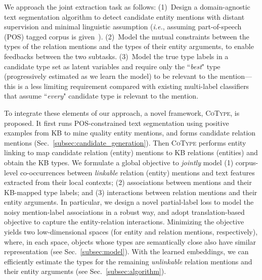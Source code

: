 \documentclass[letterpaper]{sig-alternate-2013}
\def\ie{{\sl i.e.}}
\begin{document}
We approach the joint extraction task as follows: (1)~Design a domain-agnostic text segmentation algorithm to detect candidate entity mentions with distant supervision and minimal linguistic assumption (\ie, assuming part-of-speech (POS) tagged corpus is given~\cite{hovy2015mining}). 
(2)~Model the mutual constraints between the types of the relation mentions and the types of their entity arguments, to enable feedbacks between the two subtasks. (3)~Model the true type labels in a candidate type set as latent variables and require only the ``\textit{best}" type (progressively estimated as we learn the model) to be relevant to the mention---this is a less limiting requirement compared with existing multi-label classifiers that assume ``\textit{every}" candidate type is relevant to the mention.



To integrate these elements of our approach, a novel framework, \textsc{CoType}, is proposed. It first runs POS-constrained text segmentation using positive examples from KB to mine quality entity mentions, and forms candidate relation mentions (Sec.~\ref{subsec:candidate_generation}). Then \textsc{CoType} performs entity linking to map candidate relation (entity) mentions to KB relations (entities) and obtain the KB types. We formulate a global objective to \textit{jointly} model (1) corpus-level co-occurrences between \textit{linkable} relation (entity) mentions and text features extracted from their local contexts; (2) associations between mentions and their KB-mapped type labels; and (3) interactions between relation mentions and their entity arguments. In particular, we design a novel partial-label loss to model the noisy mention-label associations in a robust way, and adopt translation-based objective to capture the entity-relation interactions. Minimizing the objective yields two low-dimensional spaces (for entity and relation mentions, respectively), where, in each space, objects whose types are semantically close also have similar representation (see Sec.~\ref{subsec:model}). With the learned embeddings, we can efficiently estimate the types for the remaining \textit{unlinkable} relation mentions and their entity arguments (see Sec.~\ref{subsec:algorithm}).
\end{document}
